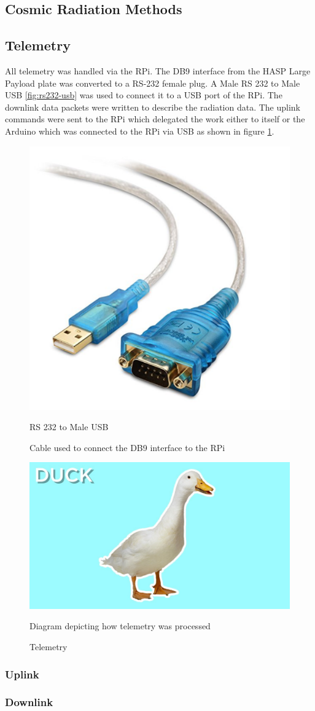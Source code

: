 \subsection{Cosmic Radiation Methods}
\label{sec:Rad-Methods}

\subsection{Telemetry}
\label{sec:Telemetry}

All telemetry was handled via the RPi. The DB9 interface from the HASP Large Payload plate was converted to a 
RS-232 female plug. A Male RS 232 to Male USB \ref{fig:rs232-usb} was used to connect it to a USB port of the RPi. 
The downlink data packets were written to describe the radiation data. 
The uplink commands were sent to the RPi which delegated the work either to itself or the Arduino which 
was connected to the RPi via USB as shown in figure \ref{fig:telem-diagram}.

\begin{figure}[h!]
\centering
\begin{minipage}{.5\textwidth}
  \centering
  \includegraphics[width=.4\linewidth]{figures/rs232tousb.png}
  \caption{RS 232 to Male USB}{Cable used to connect the DB9 interface to the RPi}
  \label{fig:rs232tousb}
\end{minipage}%
\begin{minipage}{.5\textwidth}
  \centering
  \includegraphics[width=.4\linewidth]{figures/duck.jpg}
  \caption{Telemetry}{Diagram depicting how telemetry was processed}
  \label{fig:telem-diagram}
\end{minipage}
\end{figure}

\subsubsection{Uplink}
\label{sec:Uplink} 


\subsubsection{Downlink}
\label{sec:Downlink}
